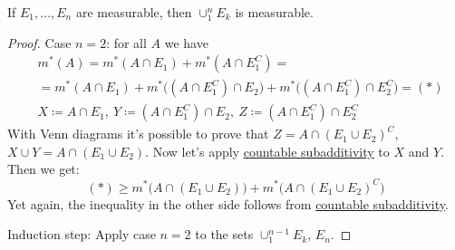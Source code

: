 \begin{proposition}  
    \label{the:measurableUnion}
    If $E_1, \dots, E_n$ are measurable, then 
    $\cup_{1}^n E_k$ is measurable.
\end{proposition}
\begin{proof}
    Case $n=2$:
    for all $A$ we have
    \begin{align*}
        &
        m^*(A) = m^*(A \cap E_1) +  m^*(A \cap E_1^C)
        =\\&=
        m^*(A \cap E_1) + m^*\bigl((A \cap E_1^C) \cap E_2\bigr) +
        m^*\bigl((A \cap E_1^C) \cap E_2^C\bigr) = (*)
        \\&
        X \coloneqq A \cap E_1,\
        Y \coloneqq (A \cap E_1^C) \cap E_2,\
        Z \coloneqq (A \cap E_1^C) \cap E_2^C
    \end{align*}
    With Venn diagrams it's possible to prove that 
    $Z = A \cap (E_1 \cup E_2)^C$, $X \cup Y = A \cap (E_1 \cup E_2)$.
    Now let's apply \hyperref[the:countableSubadditivity]{countable subadditivity} to $X$ and $Y$. Then we get:
    \[
        (*) \ge m^*\bigl(A \cap (E_1 \cup E_2)\bigr) +
        m^*\bigl(A \cap (E_1 \cup E_2)^C\bigr)
    \]
    Yet again, the inequality in the other side follows from 
    \hyperref[the:countableSubadditivity]{countable subadditivity}.

    Induction step:
    Apply case $n=2$ to the sets 
    $\cup_{1}^{n - 1} E_k$, $E_n$.
\end{proof}
